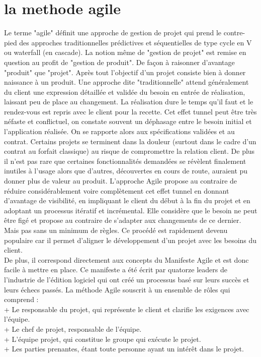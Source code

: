 \documentclass[11pt]{report}
\begin{document}
\section{la methode agile}
Le terme "agile" définit une approche de gestion de projet qui prend le contre-pied des
approches traditionnelles prédictives et séquentielles de type cycle en V ou waterfall (en cascade).
La notion même de "gestion de projet" est remise en question au profit de "gestion de produit". De
façon à raisonner d’avantage "produit" que "projet". Après tout l'objectif d'un projet consiste bien à
donner naissance à un produit.
Une approche dite "traditionnelle" attend généralement du client une expression détaillée et
validée du besoin en entrée de réalisation, laissant peu de place au changement. La réalisation dure
le temps qu'il faut et le rendez-vous est repris avec le client pour la recette. Cet effet tunnel peut être
très néfaste et conflictuel, on constate souvent un déphasage entre le besoin initial et l'application
réalisée. On se rapporte alors aux spécifications validées et au contrat.
Certains projets se terminent dans la douleur (surtout dans le cadre d'un contrat au
forfait classique) au risque de compromettre la relation client. De plus il n'est pas rare que certaines
fonctionnalités demandées se révèlent finalement inutiles à l'usage alors que d'autres, découvertes en
cours de route, auraient pu donner plus de valeur au produit.
L'approche Agile propose au contraire de réduire considérablement voire complètement cet effet
tunnel en donnant d’avantage de visibilité, en impliquant le client du début à la fin du projet et en
adoptant un processus itératif et incrémental. Elle considère que le besoin ne peut être figé et
propose au contraire de s'adapter aux changements de ce dernier. Mais pas sans un minimum de
règles. Ce procédé est rapidement devenu populaire car il permet d’aligner le développement d’un
projet avec les besoins du client.\\
De plus, il correspond directement aux concepts du Manifeste Agile et est donc facile à mettre
en place. Ce manifeste a été écrit par quatorze leaders de l'industrie de l’édition logiciel qui ont créé
un processus basé sur leurs succès et leurs échecs passés.
La méthode Agile souscrit à un ensemble de rôles qui comprend :\\
+ Le responsable du projet, qui représente le client et clarifie les exigences avec l'équipe.\\
+ Le chef de projet, responsable de l'équipe.\\
+ L'équipe projet, qui constitue le groupe qui exécute le projet.\\
+ Les parties prenantes, étant toute personne ayant un intérêt dans le projet.
\end{document}
